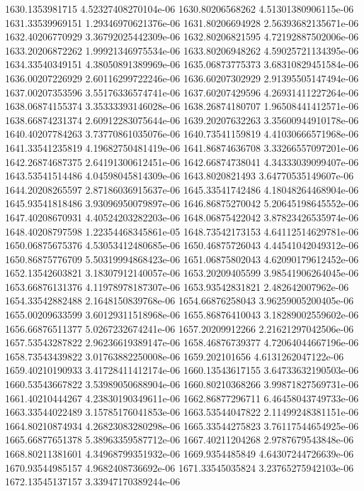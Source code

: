 {1630.1353981715 4.52327408270104e-06
1630.80206568262 4.51301380906115e-06
1631.33539969151 1.29346970621376e-06
1631.80206694928 2.56393682135671e-06
1632.40206770929 3.36792025442309e-06
1632.80206821595 4.72192887502006e-06
1633.20206872262 1.99921346975534e-06
1633.80206948262 4.59025721134395e-06
1634.33540349151 4.38050891389969e-06
1635.06873775373 3.68310829451584e-06
1636.00207226929 2.60116299722246e-06
1636.60207302929 2.91395505147494e-06
1637.00207353596 3.55176336574741e-06
1637.60207429596 4.26931411227264e-06
1638.06874155374 3.35333393146028e-06
1638.26874180707 1.96508441412571e-06
1638.66874231374 2.60912283075644e-06
1639.20207632263 3.35600944910178e-06
1640.40207784263 3.73770861035076e-06
1640.73541159819 4.41030666571968e-06
1641.33541235819 4.19682750481419e-06
1641.86874636708 3.33266557097201e-06
1642.26874687375 2.64191300612451e-06
1642.66874738041 4.34333039099407e-06
1643.53541514486 4.04598045814309e-06
1643.8020821493 3.64770535149607e-06
1644.20208265597 2.87186036915637e-06
1645.33541742486 4.18048264468904e-06
1645.93541818486 3.93096950079897e-06
1646.86875270042 5.20645198645552e-06
1647.40208670931 4.40524203282203e-06
1648.06875422042 3.87823426535974e-06
1648.40208797598 1.22354468345861e-05
1648.73542173153 4.64112514629781e-06
1650.06875675376 4.53053412480685e-06
1650.46875726043 4.44541042049312e-06
1650.86875776709 5.50319994868423e-06
1651.06875802043 4.62090179612452e-06
1652.13542603821 3.18307912140057e-06
1653.20209405599 3.98541906264045e-06
1653.66876131376 4.11978978187307e-06
1653.93542831821 2.482642007962e-06
1654.33542882488 2.1648150839768e-06
1654.66876258043 3.96259005200405e-06
1655.00209633599 3.60129311518968e-06
1655.86876410043 3.18289002559602e-06
1656.66876511377 5.0267232674241e-06
1657.20209912266 2.21621297042506e-06
1657.53543287822 2.96236619389147e-06
1658.46876739377 4.72064044667196e-06
1658.73543439822 3.01763882250008e-06
1659.202101656 4.6131262047122e-06
1659.40210190933 3.41728411412174e-06
1660.13543617155 3.64733632190503e-06
1660.53543667822 3.53989050688904e-06
1660.80210368266 3.99871827569731e-06
1661.40210444267 4.23830190349611e-06
1662.86877296711 6.46458043749733e-06
1663.33544022489 3.15785176041853e-06
1663.53544047822 2.11499248381151e-06
1664.80210874934 4.26823083280298e-06
1665.33544275823 3.76117544654925e-06
1665.66877651378 5.38963359587712e-06
1667.40211204268 2.9787679543848e-06
1668.80211381601 4.34968799351932e-06
1669.9354485849 4.64307244726639e-06
1670.93544985157 4.9682408736692e-06
1671.33545035824 3.23765275942103e-06
1672.13545137157 3.33947170389244e-06
}
